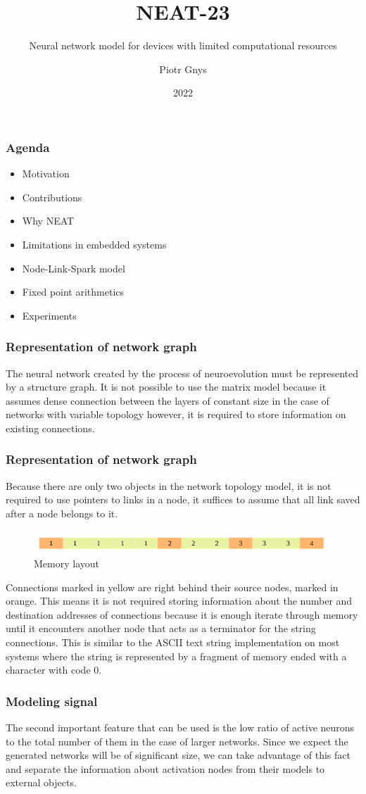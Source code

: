 \documentclass{beamer}
\title{NEAT-23}
\subtitle{Neural network model for devices with limited computational resources}
\author{Piotr Gnys}
\institute{Polish Japanese Academy of Information Technology}
\date{2022}
\begin{document}
\frame{\titlepage}

\begin{frame}
\frametitle{Agenda}
	\begin{itemize}
		\item Motivation
		\item Contributions
		\item Why NEAT
		\item Limitations in embedded systems
		\item Node-Link-Spark model
		\item Fixed point arithmetics
		\item Experiments
	\end{itemize}
\end{frame}

\begin{frame}
\frametitle{Representation of network graph}
	The neural network created by the process of neuroevolution must be represented by a structure
	graph.
	It is not possible to use the matrix model because it assumes dense connection between the 
	layers of constant size in the case of networks with variable topology however, it is required 
	to store information on existing connections.
\end{frame}

\begin{frame}
\frametitle{Representation of network graph}
	Because there are only two objects in the network topology model, it is not required
	to use pointers to links in a node, it suffices to assume that all link saved after a node 
	belongs to it.
	\begin{figure}[htb] 
		\label{fig:neuron}
		\includegraphics[width=\textwidth]{figures/in_memo}
		\caption{Memory layout}
	\end{figure}
	Connections marked in yellow are right behind their source nodes, marked in orange. 
	This means it is not required storing information about the number and destination addresses 
	of connections because it is enough iterate through memory until it encounters another node 
	that acts as a terminator for the string connections.
	This is similar to the ASCII text string implementation on most systems where the string is 
	represented by a fragment of memory ended with a character with code 0.
\end{frame}

\begin{frame}
\frametitle{Modeling signal}
The second important feature that can be used is the low ratio of active neurons to
the total number of them in the case of larger networks.
Since we expect the generated networks will be of significant size, we can take advantage of this
fact and separate the information about activation nodes from their models to external objects. 
\end{frame}
\end{document}
